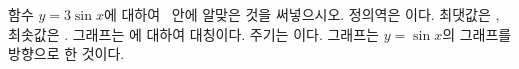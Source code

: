 함수 $y=3\sin x$에 대하여 \blank\ 안에 알맞은 것을 써넣으시오.
 정의역은 \blank[6em]이다.
 최댓값은 , 최솟값은 .
 그래프는 \blank[3em]에 대하여 대칭이다.
 주기는 \blank[2.5em]이다.
 그래프는 $y=\sin x$의 그래프를  방향으로  한 것이다.
